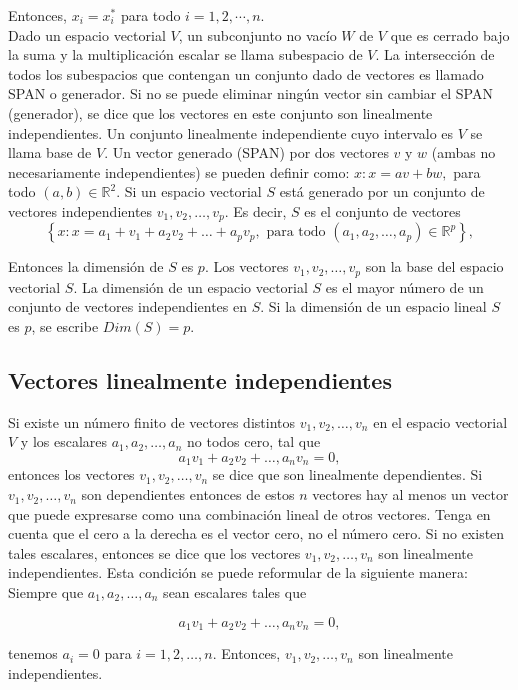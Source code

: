 Entonces, $x_i=x_i^*$ para todo $i=1,2,\cdots , n.$\\ 

Dado un espacio vectorial $V$, un subconjunto no vacío $W$ de $V$ que es cerrado bajo la suma y la multiplicación escalar se llama subespacio de $V$. La intersección de todos los subespacios que contengan un conjunto dado de vectores es llamado SPAN o generador. Si no se puede eliminar ningún vector sin cambiar el SPAN (generador), se dice que los vectores en este conjunto son linealmente independientes. Un conjunto linealmente independiente cuyo intervalo es $V$ se llama base de $V$. Un vector generado (SPAN) por dos vectores $v$ y $w$ (ambas no necesariamente independientes) se pueden definir como: $x:x=av+bw,$ para todo $(a,b)\in \mathbb{R}^2$. Si un espacio vectorial $S$ está generado por un conjunto de vectores independientes $v_1,v_2,\ldots , v_p$. Es decir, $S$ es el conjunto de vectores 
$$\left\{x:x=a_1+v_1+a_2v_2+\ldots+a_pv_p,\mbox{ para todo } (a_1,a_2,\ldots,a_p)\in \mathbb{R}^p\right\},$$

Entonces la dimensión de $S$ es $p$. Los vectores $v_1, v_2, \ldots , v_p$ son la base del espacio vectorial $S$. La dimensión de un espacio vectorial $S$ es el mayor número de un conjunto de vectores independientes en $S$. Si la dimensión de un espacio lineal $S$ es $p$, se escribe $Dim(S) = p$.
 

\subsection{Vectores linealmente independientes}

Si existe un número finito de vectores distintos $v_1,v_2,\ldots,v_n$ en el espacio vectorial $V$ y los escalares $a_1,a_2,\ldots,a_n$ no todos cero, tal que
$$a_1v_1+a_2v_2+\ldots,a_nv_n=0,$$
entonces los vectores $v_1,v_2,\ldots,v_n$ se dice que son linealmente dependientes. Si $v_1,v_2,\ldots,v_n$ son dependientes entonces de estos $n$ vectores hay al menos un vector que puede expresarse como una combinación lineal de otros vectores. Tenga en cuenta que el cero a la derecha es el vector cero, no el número cero. Si no existen tales escalares, entonces se dice que los vectores $v_1, v_2, \ldots , v_n$ son linealmente independientes. Esta condición se puede reformular de la siguiente manera: Siempre que $a_1 , a_2 , \ldots , a_n$ sean escalares tales que

$$a_1v_1+a_2v_2+\ldots,a_nv_n=0,$$

tenemos $a_i=0$ para $i=1,2,\ldots,n$. Entonces, $v_1,v_2,\ldots,v_n$ son linealmente independientes.\\

